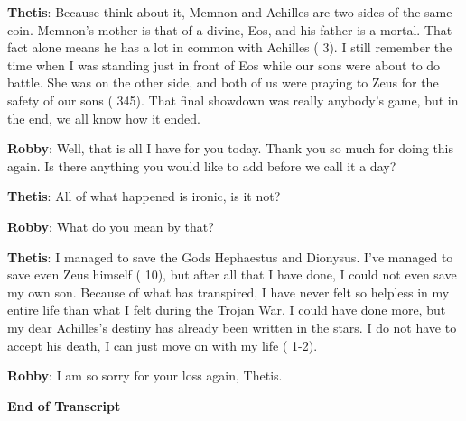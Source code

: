 \documentclass[12pt, a4paper]{article}
\begin{document}
\textbf{Thetis}: Because think about it, Memnon and Achilles are two sides of the same coin. Memnon's mother is that of a divine, Eos, and his father is a mortal. That fact alone means he has a lot in common with Achilles (\cite{wrath-of-thetis} 3). I still remember the time when I was standing just in front of Eos while our sons were about to do battle. She was on the other side, and both of us were praying to Zeus for the safety of our sons (\cite{aethiopus} 345). That final showdown was really anybody's game, but in the end, we all know how it ended.

\textbf{Robby}: Well, that is all I have for you today. Thank you so much for doing this again. Is there anything you would like to add before we call it a day?

\textbf{Thetis}: All of what happened is ironic, is it not?

\textbf{Robby}: What do you mean by that?

\textbf{Thetis}: I managed to save the Gods Hephaestus and Dionysus. I've managed to save even Zeus himself (\cite{wrath-of-thetis} 10), but after all that I have done, I could not even save my own son. Because of what has transpired, I have never felt so helpless in my entire life than what I felt during the Trojan War. I could have done more, but my dear Achilles's destiny has already been written in the stars. I do not have to accept his death, I can just move on with my life (\cite{wrath-of-thetis} 1-2).

\textbf{Robby}: I am so sorry for your loss again, Thetis.

\begin{center}
	\textbf{End of Transcript}
\end{center}

\newpage

\printbibliography
\end{document}
